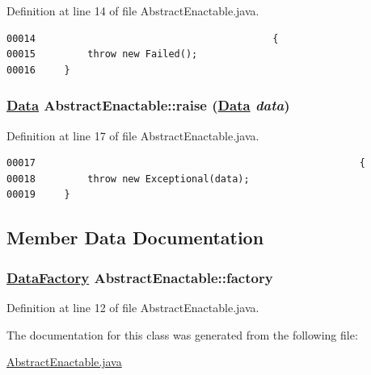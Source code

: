 Definition at line 14 of file Abstract\-Enactable.java.\footnotesize\begin{verbatim}00014                                         {
00015         throw new Failed();
00016     }
\end{verbatim}\normalsize 
\hypertarget{classAbstractEnactable_b1}{
\subsubsection[raise]{\setlength{\rightskip}{0pt plus 5cm}\hyperlink{interfaceData}{Data} Abstract\-Enactable::raise (\hyperlink{interfaceData}{Data} {\em data})}}
\label{classAbstractEnactable_b1}




Definition at line 17 of file Abstract\-Enactable.java.\footnotesize\begin{verbatim}00017                                                        {
00018         throw new Exceptional(data);
00019     }
\end{verbatim}\normalsize 


\subsection{Member Data Documentation}
\hypertarget{classAbstractEnactable_n0}{
\subsubsection[factory]{\setlength{\rightskip}{0pt plus 5cm}\hyperlink{interfaceDataFactory}{Data\-Factory} Abstract\-Enactable::factory}}
\label{classAbstractEnactable_n0}




Definition at line 12 of file Abstract\-Enactable.java.

The documentation for this class was generated from the following file:\begin{CompactItemize}
\item 
\hyperlink{AbstractEnactable_8java-source}{Abstract\-Enactable.java}\end{CompactItemize}

